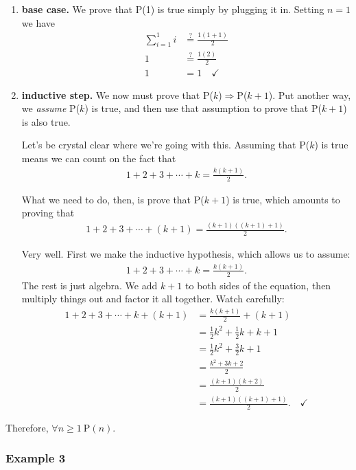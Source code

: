 \begin{enumerate} 

\item \textbf{base case.} We prove that P(1) is true simply by plugging it
in. Setting $n=1$ we have
\begin{align*}
\sum_{i=1}^1{i} & \stackrel{?}{=} \frac{1(1+1)}{2} \\
1 & \stackrel{?}{=} \frac{1(2)}{2} \\
1 &= 1 \quad \checkmark
\end{align*}

\item \textbf{inductive step.}
We now must prove that P($k$)$\Rightarrow$P($k+1$). Put another way, we
\textit{assume} P($k$) is true, and then use that assumption to prove that
P($k+1$) is also true.

Let's be crystal clear where we're going with this. Assuming that P($k$) is
true means we can count on the fact that
\begin{align*}
1+2+3+\cdots+k = \frac{k(k+1)}{2}.
\end{align*}

What we need to do, then, is prove that P($k+1$) is true, which amounts to
proving that
\begin{align*}
1+2+3+\cdots+(k+1) = \frac{(k+1)((k+1)+1)}{2}.
\end{align*}

Very well. First we make the inductive hypothesis, which allows us to
assume:
\begin{align*}
1+2+3+\cdots+k = \frac{k(k+1)}{2}.
\end{align*}
The rest is just algebra. We add $k+1$ to both sides of the equation, then
multiply things out and factor it all together. Watch carefully:
\begin{align*}
1+2+3+\cdots+k+(k+1) &= \frac{k(k+1)}{2} + (k+1) \\
&= \frac{1}{2}k^2 + \frac{1}{2}k + k + 1 \\
&= \frac{1}{2}k^2 + \frac{3}{2}k + 1 \\
&= \frac{k^2+3k+2}{2} \\
&= \frac{(k+1)(k+2)}{2} \\
&= \frac{(k+1)((k+1)+1)}{2}. \quad \checkmark
\end{align*}

\end{enumerate}
Therefore, $\forall n\geq1 \ \text{P}(n)$.


\subsubsection{Example 3}

